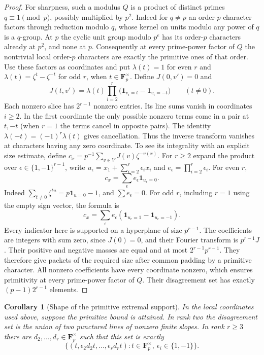\documentclass[11pt,letterpaper]{article}
\newcommand{\Fp}{\mathbf F_p}
\newtheorem{corollary}[theorem]{Corollary}
\theoremstyle{remark}
\begin{document}
\begin{proof}
For sharpness, such a modulus $Q$ is a product of distinct primes
$q\equiv1\pmod p$, possibly multiplied by $p^2$. Indeed for
$q\ne p$ an order-$p$ character factors through reduction modulo $q$,
whose kernel on units modulo any power of $q$ is a $q$-group. At $p$
the cyclic unit group modulo $p^e$ has its order-$p$ characters
already at $p^2$, and none at $p$. Consequently at every prime-power
factor of $Q$ the nontrivial local order-$p$ characters are exactly
the primitive ones of that order. Use these factors as coordinates and put
$\lambda(t)=1$ for even $r$ and
$\lambda(t)=\zeta^t-\zeta^{-t}$ for odd $r$, when $t\in\Fp^\times$.
Define $J(0,v')=0$ and
\[
 J(t,v')=\lambda(t)\prod_{i=2}^r
  \big(\mathbf1_{v_i=t}-\mathbf1_{v_i=-t}\big)
 \qquad(t\ne0).
\]
Each nonzero slice has $2^{r-1}$ nonzero entries.  Its line sums vanish in coordinates
$i\ge2$. In the first coordinate the only possible nonzero terms come
in a pair at $t,-t$ (when $r=1$ the terms cancel in opposite pairs).
The identity $\lambda(-t)=(-1)^r\lambda(t)$ gives cancellation.
Thus the inverse transform vanishes at characters having any zero
coordinate.  To see its integrality with an explicit size estimate,
define $c_x=p^{-1}\sum_{v\in V}J(v)\zeta^{-v(x)}$.
For $r\ge2$ expand the product over
$\epsilon\in\{1,-1\}^{r-1}$, write
$u_\epsilon=x_1+\sum_{i=2}^r\epsilon_i x_i$ and
$e_\epsilon=\prod_{i=2}^r\epsilon_i$. For even $r$,
\[
 c_x=\sum_\epsilon e_\epsilon\mathbf1_{u_\epsilon=0}.
\]
Indeed $\sum_{t\ne0}\zeta^{tu}=p\mathbf1_{u=0}-1$, and
$\sum e_\epsilon=0$. For odd $r$, including $r=1$ using the empty sign
vector, the formula is
\[
 c_x=\sum_\epsilon e_\epsilon
       (\mathbf1_{u_\epsilon=1}-\mathbf1_{u_\epsilon=-1}).
\]
Every indicator here is supported on a hyperplane of size $p^{r-1}$.
The coefficients are integers with sum zero, since $J(0)=0$, and
their Fourier transform is $p^{r-1}J$. Their positive and negative
masses are equal and at most $2^{r-1}p^{r-1}$. They therefore give
packets of the required size after common padding by a primitive
character. All nonzero coefficients have every coordinate nonzero, which
ensures primitivity at every prime-power factor of $Q$. Their disagreement set
has exactly $(p-1)2^{r-1}$ elements.
\end{proof}
\begin{corollary}[Shape of the primitive extremal support]\label{thm:primshape}
In the local coordinates used above, suppose the primitive bound is
attained. In rank two the disagreement set is the union of two
punctured lines of nonzero finite slopes.  In rank $r\ge3$ there are
$d_2,\dots,d_r\in\Fp^\times$ such that this set is exactly
\[
 \{(t,\epsilon_2d_2t,\dots,\epsilon_rd_rt):
      t\in\Fp^\times,\ \epsilon_i\in\{1,-1\}\}.
\]
\end{corollary}
\end{document}
